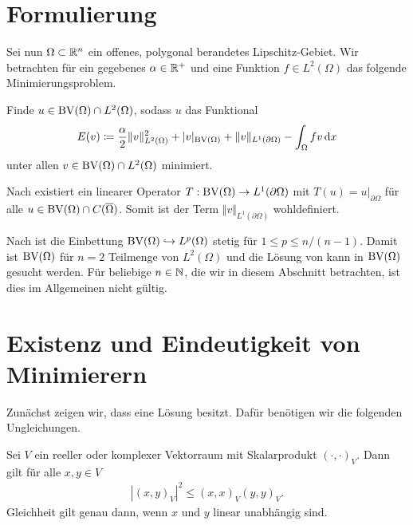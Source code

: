 \section{Formulierung}
Sei nun $\Omega \subset \mathbb{R}^n$ ein offenes, polygonal berandetes
Lipschitz-Gebiet.
Wir betrachten für ein gegebenes $\alpha\in\mathbb{R}^+$ und eine Funktion
$f\in L^2(\Omega)$ das 
folgende Minimierungsproblem. 

\begin{problem}\label{prob:continuousProblem}
  Finde $u\in \textup{BV}(\Omega)\cap L^2(\Omega)$, sodass
  $u$ das Funktional
  \begin{align}\label{eq:continuousProblem}
    E(v)\coloneqq \frac{\alpha}{2}\Vert v\Vert_{L^2(\Omega)}^2 + |v|_{\textup{BV}(\Omega)}
    +\Vert v\Vert_{L^1(\partial\Omega)}-\int_\Omega fv\,\mathrm{d}x
  \end{align}
  unter allen $v\in\textup{BV}(\Omega)\cap L^2(\Omega)$ minimiert.

  Nach \cite[S. 400, Theorem 10.2.1]{ABM14} existiert ein linearer Operator
  $T:\textup{BV}(\Omega)\to L^1(\partial\Omega)$ mit $T(u) = u|_{\partial\Omega}$ für
  alle $u\in\textup{BV}(\Omega)\cap C(\overline\Omega)$. Somit ist der Term $\Vert
  v\Vert_{L^1(\partial\Omega)}$ wohldefiniert.
\end{problem}

\begin{remark}
  Nach \cite[S. 399, Theorem 10.1.3]{ABM14} ist 
  die Einbettung $\textup{BV}(\Omega)\hookrightarrow L^p(\Omega)$ stetig für 
  $1\leq p\leq n/(n-1)$. 
  Damit ist $\textup{BV}(\Omega)$ für $n=2$ Teilmenge von $L^2(\Omega)$ und die
  Lösung von  kann in
  $\textup{BV}(\Omega)$ gesucht werden. Für beliebige $n\in\mathbb{N}$, die wir in diesem
  Abschnitt betrachten, ist dies im Allgemeinen nicht gültig.
\end{remark}

\section{Existenz und Eindeutigkeit von Minimierern}
Zunächst zeigen wir, dass  eine Lösung besitzt.
Dafür benötigen wir die folgenden Ungleichungen.
\begin{lemma}
  \label{lem:csu}
  Sei $V$ ein reeller oder komplexer Vektorraum mit Skalarprodukt
  $(\cdot,\cdot)_V$. Dann gilt für alle $x,y\in V$
  \begin{align*}
    |(x,y)_V|^2\leq (x,x)_V (y,y)_V.
  \end{align*}
  Gleichheit gilt genau dann, wenn $x$ und $y$ linear unabhängig sind.
\end{lemma}

